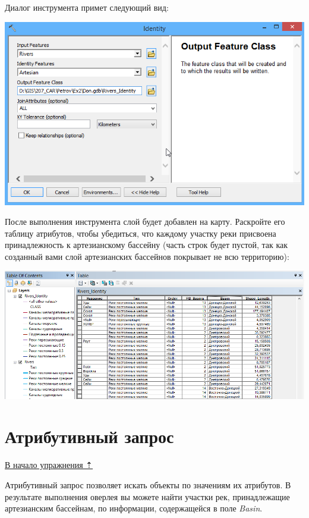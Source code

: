 \documentclass[]{book}
\theoremstyle{definition}
\theoremstyle{definition}
\theoremstyle{definition}
\theoremstyle{remark}
\begin{document}
\begin{enumerate}
  Диалог инструмента примет следующий вид:

  \includegraphics{images/Ex05/image20.png}
\end{enumerate}

После выполнения инструмента слой будет добавлен на карту. Раскройте его
таблицу атрибутов, чтобы убедиться, что каждому участку реки присвоена
принадлежность к артезианскому бассейну (часть строк будет пустой, так
как созданный вами слой артезианских бассейнов покрывает не всю
территорию):

\includegraphics{images/Ex05/image21.png}

\hypertarget{map-ref-hydrogeologic-attributes}{%
\section{Атрибутивный запрос}\label{map-ref-hydrogeologic-attributes}}

\protect\hyperlink{map-ref-hydrogeologic}{В начало упражнения ⇡}

Атрибутивный запрос позволяет искать объекты по значениям их атрибутов.
В результате выполнения оверлея вы можете найти участки рек,
принадлежащие артезианским бассейнам, по информации, содержащейся в поле
\emph{Basin}.
\end{document}
